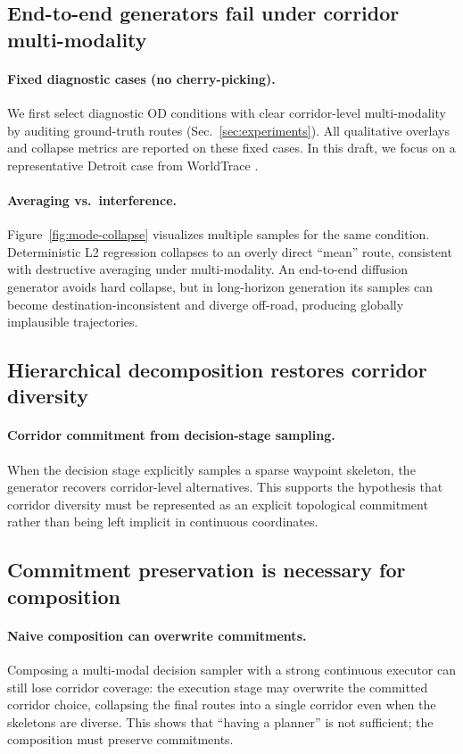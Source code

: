 \subsection{End-to-end generators fail under corridor multi-modality}
\paragraph{Fixed diagnostic cases (no cherry-picking).}
We first select diagnostic OD conditions with clear corridor-level multi-modality by auditing ground-truth routes (Sec.~\ref{sec:experiments}).
All qualitative overlays and collapse metrics are reported on these fixed cases.
In this draft, we focus on a representative Detroit case from WorldTrace \citep{opentrace_worldtrace}.

\paragraph{Averaging vs.\ interference.}
Figure~\ref{fig:mode-collapse} visualizes multiple samples for the same condition.
Deterministic L2 regression collapses to an overly direct ``mean'' route, consistent with destructive averaging under multi-modality.
An end-to-end diffusion generator avoids hard collapse, but in long-horizon generation its samples can become destination-inconsistent and diverge off-road, producing globally implausible trajectories.

\subsection{Hierarchical decomposition restores corridor diversity}
\paragraph{Corridor commitment from decision-stage sampling.}
When the decision stage explicitly samples a sparse waypoint skeleton, the generator recovers corridor-level alternatives.
This supports the hypothesis that corridor diversity must be represented as an explicit topological commitment rather than being left implicit in continuous coordinates.

\subsection{Commitment preservation is necessary for composition}
\paragraph{Naive composition can overwrite commitments.}
Composing a multi-modal decision sampler with a strong continuous executor can still lose corridor coverage: the execution stage may overwrite the committed corridor choice, collapsing the final routes into a single corridor even when the skeletons are diverse.
This shows that ``having a planner'' is not sufficient; the composition must preserve commitments.

